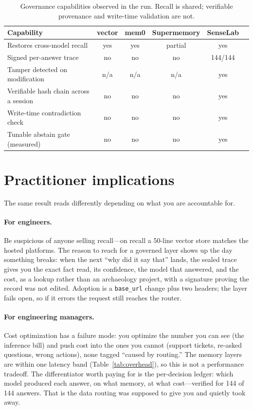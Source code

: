 \documentclass[11pt]{article}
\begin{document}
\begin{table}[t]
\centering
\small
\begin{tabular}{lccccc}
\toprule
Capability & vector & mem0 & Supermemory & SenseLab \\
\midrule
Restores cross-model recall            & yes & yes & partial & yes \\
Signed per-answer trace                & no  & no  & no      & 144/144 \\
Tamper detected on modification        & n/a & n/a & n/a     & yes \\
Verifiable hash chain across a session & no  & no  & no      & yes \\
Write-time contradiction check         & no  & no  & no      & yes \\
Tunable abstain gate (measured)        & no  & no  & no      & yes \\
\bottomrule
\end{tabular}
\caption{Governance capabilities observed in the run. Recall is shared; verifiable
provenance and write-time validation are not.}
\label{tab:gov}
\end{table}

\section{Practitioner implications}\label{sec:impl}

The same result reads differently depending on what you are accountable for.

\paragraph{For engineers.} Be suspicious of anyone selling recall---on recall a 50-line
vector store matches the hosted platforms. The reason to reach for a governed layer shows up
the day something breaks: when the next ``why did it say that'' lands, the sealed trace gives
you the exact fact read, its confidence, the model that answered, and the cost, as a lookup
rather than an archaeology project, with a signature proving the record was not edited.
Adoption is a \texttt{base\_url} change plus two headers; the layer fails open, so if it
errors the request still reaches the router.

\paragraph{For engineering managers.} Cost optimization has a failure mode: you optimize the
number you can see (the inference bill) and push cost into the ones you cannot (support
tickets, re-asked questions, wrong actions), none tagged ``caused by routing.'' The memory
layers are within one latency band (Table~\ref{tab:overhead}), so this is not a
performance tradeoff. The differentiator worth paying for is the per-decision ledger: which
model produced each answer, on what memory, at what cost---verified for 144 of 144 answers.
That is the data routing was supposed to give you and quietly took away.
\end{document}

